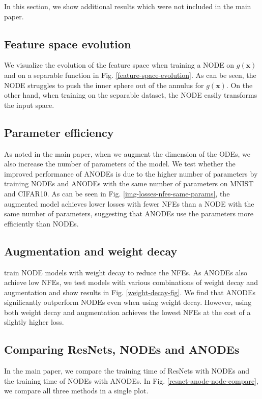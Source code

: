 \documentclass{article}
\begin{document}
In this section, we show additional results which were not included in the main paper.

\subsection{Feature space evolution}

We visualize the evolution of the feature space when training a NODE on $g(\mathbf{x})$ and on a separable function in Fig. \ref{feature-space-evolution}. As can be seen, the NODE struggles to push the inner sphere out of the annulus for $g(\mathbf{x})$. On the other hand, when training on the separable dataset, the NODE easily transforms the input space.

\subsection{Parameter efficiency}

As noted in the main paper, when we augment the dimension of the ODEs, we also increase the number of parameters of the model. We test whether the improved performance of ANODEs is due to the higher number of parameters by training NODEs and ANODEs with the same number of parameters on MNIST and CIFAR10. As can be seen in Fig. \ref{img-losses-nfes-same-params}, the augmented model achieves lower losses with fewer NFEs than a NODE with the same number of parameters, suggesting that ANODEs use the parameters more efficiently than NODEs.

\subsection{Augmentation and weight decay}

\cite{grathwohl2018ffjord} train NODE models with weight decay to reduce the NFEs. As ANODEs also achieve low NFEs, we test models with various combinations of weight decay and augmentation and show results in Fig. \ref{weight-decay-fig}. We find that ANODEs significantly outperform NODEs even when using weight decay. However, using both weight decay and augmentation achieves the lowest NFEs at the cost of a slightly higher loss.

\subsection{Comparing ResNets, NODEs and ANODEs}

In the main paper, we compare the training time of ResNets with NODEs and the training time of NODEs with ANODEs. In Fig. \ref{resnet-anode-node-compare}, we compare all three methods in a single plot.
\end{document}
